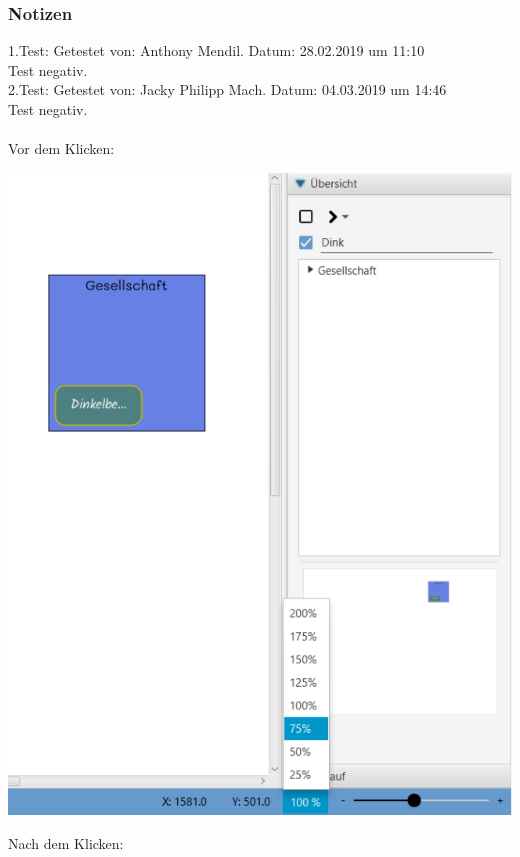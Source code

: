 \documentclass[enabledeprecatedfontcommands]{scrartcl}
\begin{document}
\subsubsection{Notizen}
1.Test: Getestet von: Anthony Mendil. Datum: 28.02.2019 um 11:10 \\
Test negativ.\\
2.Test: Getestet von: Jacky Philipp Mach. Datum: 04.03.2019 um 14:46 \\
Test negativ.\\\\
\newpage
Vor dem Klicken:
\begin{center}
\includegraphics[height=17cm]{zoom75vorher.PNG}
\end{center}
\newpage
Nach dem Klicken: 
\end{document}
